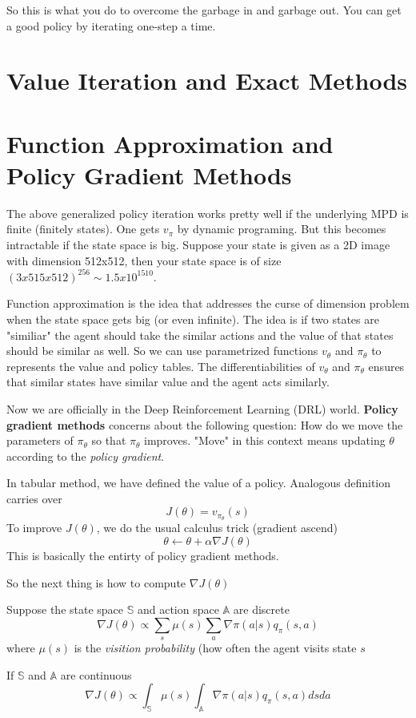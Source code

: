 \documentclass{article}
\begin{document}
So this is what you do to overcome the garbage in and garbage out. 
You can get a good policy by iterating one-step a time.

\section{Value Iteration and Exact Methods}

\section{Function Approximation and Policy Gradient Methods}
The above generalized policy iteration works pretty well if the underlying
MPD is finite (finitely states). One gets $v_{\pi}$ by dynamic programing.
But this becomes intractable if the state space is big. Suppose your 
state is given as a 2D image with dimension 512x512, then your state
space is of size $(3x515x512)^{256} \sim 1.5x10^{1510}$. 

Function approximation is the idea that addresses the curse of dimension
problem when the state space gets big (or even infinite). The idea is 
if two states are "similiar" the agent should take the similar actions 
and the value of that states should be similar as well. So we can use
parametrized functions $v_{\theta}$ and $\pi_{\theta}$ to represents 
the value and policy tables. The differentiabilities of $v_{\theta}$ 
and $\pi_{\theta}$ ensures that similar states have similar value and 
the agent acts similarly. 

Now we are officially in the Deep Reinforcement Learning (DRL) world. 
\textbf{Policy gradient methods} concerns about the following question:
How do we move the parameters of $\pi_{\theta}$ so that $\pi_{\theta}$
improves. "Move" in this context means updating $\theta$ according to 
the \emph{policy gradient}. 

In tabular method, we have defined the value of a policy. Analogous 
definition carries over
\[
    J(\theta) = v_{\pi_{\theta}}(s)
\]
To improve $J(\theta)$, we do the usual calculus trick (gradient ascend)
\[
    \theta \leftarrow \theta + \alpha \nabla J(\theta)
\]
This is basically the entirty of policy gradient methods.

So the next thing is how to compute $\nabla J(\theta)$ 


\begin{theorem}
Suppose the state space $\mathbb{S}$ and action space $\mathbb{A}$ 
are discrete
\[
    \nabla J(\theta) \propto \sum_{s}\mu(s)\sum_{a} 
    \nabla \pi(a|s)q_{\pi}(s, a)
\]
where $\mu(s)$ is the \emph{visition probability} (how often the 
agent visits state $s$

If $\mathbb{S}$ and $\mathbb{A}$ are continuous
\[
    \nabla J(\theta) \propto \int_{\mathbb{S}}\mu(s)\int_{\mathbb{A}} 
    \nabla\pi(a|s)q_{\pi}(s, a) dsda
\]
\end{theorem}
\end{document}
